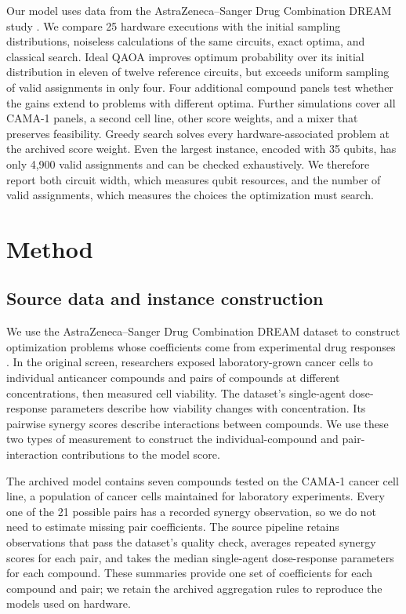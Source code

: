 \documentclass[utf8]{FrontiersinHarvard}
\begin{document}
Our model uses data from the AstraZeneca--Sanger Drug Combination DREAM study \citep{menden2019}. We compare 25 hardware executions with the initial sampling distributions, noiseless calculations of the same circuits, exact optima, and classical search. Ideal QAOA improves optimum probability over its initial distribution in eleven of twelve reference circuits, but exceeds uniform sampling of valid assignments in only four. Four additional compound panels test whether the gains extend to problems with different optima. Further simulations cover all CAMA-1 panels, a second cell line, other score weights, and a mixer that preserves feasibility. Greedy search solves every hardware-associated problem at the archived score weight. Even the largest instance, encoded with 35 qubits, has only 4,900 valid assignments and can be checked exhaustively. We therefore report both circuit width, which measures qubit resources, and the number of valid assignments, which measures the choices the optimization must search.

\section{Method}
\subsection{Source data and instance construction}
We use the AstraZeneca--Sanger Drug Combination DREAM dataset to construct optimization problems whose coefficients come from experimental drug responses \citep{menden2019}. In the original screen, researchers exposed laboratory-grown cancer cells to individual anticancer compounds and pairs of compounds at different concentrations, then measured cell viability. The dataset's single-agent dose-response parameters describe how viability changes with concentration. Its pairwise synergy scores describe interactions between compounds. We use these two types of measurement to construct the individual-compound and pair-interaction contributions to the model score.

The archived model contains seven compounds tested on the CAMA-1 cancer cell line, a population of cancer cells maintained for laboratory experiments. Every one of the 21 possible pairs has a recorded synergy observation, so we do not need to estimate missing pair coefficients. The source pipeline retains observations that pass the dataset's quality check, averages repeated synergy scores for each pair, and takes the median single-agent dose-response parameters for each compound. These summaries provide one set of coefficients for each compound and pair; we retain the archived aggregation rules to reproduce the models used on hardware.
\end{document}
